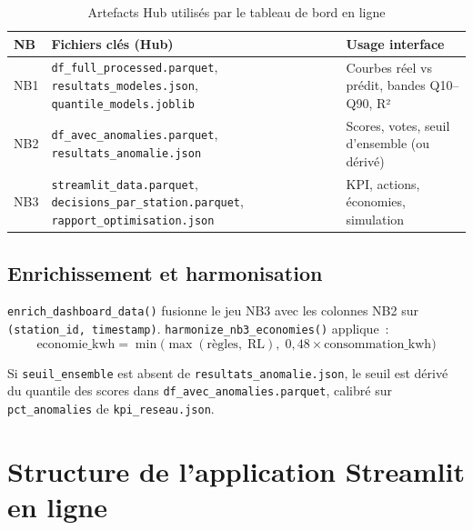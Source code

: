 \begin{table}[htbp]
  \centering
  \caption{Artefacts Hub utilisés par le tableau de bord en ligne}
  \label{tab:artefacts}
  \begin{tabular}{@{}p{0.7cm}p{5.5cm}p{6cm}@{}}
    \toprule
    \textbf{NB} & \textbf{Fichiers clés (Hub)} & \textbf{Usage interface} \\
    \midrule
    NB1 &
    \texttt{df\_full\_processed.parquet},
    \texttt{resultats\_modeles.json},
    \texttt{quantile\_models.joblib} &
    Courbes réel vs prédit, bandes Q10--Q90, R² \\
    \addlinespace
    NB2 &
    \texttt{df\_avec\_anomalies.parquet},
    \texttt{resultats\_anomalie.json} &
    Scores, votes, seuil d'ensemble (ou dérivé) \\
    \addlinespace
    NB3 &
    \texttt{streamlit\_data.parquet},
    \texttt{decisions\_par\_station.parquet},
    \texttt{rapport\_optimisation.json} &
    KPI, actions, économies, simulation \\
    \bottomrule
  \end{tabular}
\end{table}

\subsection{Enrichissement et harmonisation}
\label{subsec:dep-enrich}

\texttt{enrich\_dashboard\_data()} fusionne le jeu NB3 avec les colonnes NB2 sur
\texttt{(station\_id, timestamp)}. \texttt{harmonize\_nb3\_economies()} applique~:
\begin{equation}
  \text{economie\_kwh}
  = \min\!\bigl(\max(\text{règles},\; \text{RL}),\;
               0{,}48 \times \text{consommation\_kwh}\bigr)
  \label{eq:eco}
\end{equation}

Si \texttt{seuil\_ensemble} est absent de \texttt{resultats\_anomalie.json}, le
seuil est dérivé du quantile des scores dans \texttt{df\_avec\_anomalies.parquet},
calibré sur \texttt{pct\_anomalies} de \texttt{kpi\_reseau.json}.

\section{Structure de l'application Streamlit en ligne}
\label{sec:dep-streamlit}

